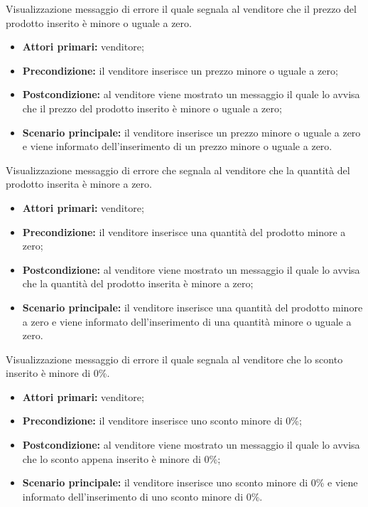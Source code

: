 Visualizzazione messaggio di errore il quale segnala al venditore che il prezzo del prodotto inserito è minore o uguale a zero.
\begin{itemize}
    \item \textbf{Attori primari:} venditore;
    \item \textbf{Precondizione:} il venditore inserisce un prezzo minore o uguale a zero;
    \item \textbf{Postcondizione:} al venditore viene mostrato un messaggio il quale lo avvisa che il prezzo del prodotto inserito è minore o uguale a zero;
    \item \textbf{Scenario principale:} il venditore inserisce un prezzo minore o uguale a zero e viene informato dell'inserimento di un prezzo minore o uguale a zero.
\end{itemize}

Visualizzazione messaggio di errore che segnala al venditore che la quantità del prodotto inserita è minore a zero.
\begin{itemize}
    \item \textbf{Attori primari:} venditore;
    \item \textbf{Precondizione:} il venditore inserisce una quantità del prodotto minore a zero;
    \item \textbf{Postcondizione:} al venditore viene mostrato un messaggio il quale lo avvisa che la quantità del prodotto inserita è minore a zero;
    \item \textbf{Scenario principale:} il venditore inserisce una quantità del prodotto minore a zero e viene informato dell'inserimento di una quantità minore o uguale a zero.
\end{itemize}

Visualizzazione messaggio di errore il quale segnala al venditore che lo sconto inserito è minore di 0\%.
\begin{itemize}
    \item \textbf{Attori primari:} venditore;
    \item \textbf{Precondizione:} il venditore inserisce uno sconto minore di 0\%;
    \item \textbf{Postcondizione:} al venditore viene mostrato un messaggio il quale lo avvisa che lo sconto appena inserito è minore di 0\%;
    \item \textbf{Scenario principale:} il venditore inserisce uno sconto minore di 0\% e viene informato dell'inserimento di uno sconto minore di 0\%.
\end{itemize}

